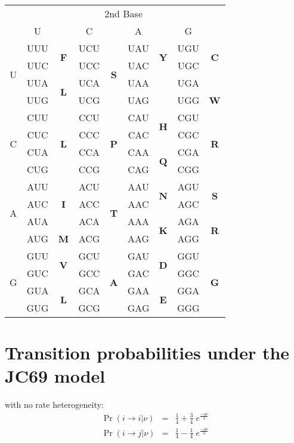 \documentclass[landscape]{foils}
\begin{document}
\begin{table}[htdp]
\begin{center}
\begin{tabular}{|c|cc|cc|cc|cc|}
\hline
 & \multicolumn{8}{c|}{2nd Base}\\
 & U && C && A && G& \\
\hline
 \multirow{4}{*}{U} & UUU & \multirow{2}{*}{\bf F} & UCU & \multirow{4}{*}{\bf S} & UAU & \multirow{2}{*}{\bf Y} & UGU & \multirow{2}{*}{\bf C}\\
	&  UUC & & UCC & & UAC & & UGC & \\
	&  UUA & \multirow{2}{*}{\bf L} & UCA & & UAA & \multirow{2}{*}{\bf *} & UGA & {\bf *} \\
	&  UUG & & UCG &  & UAG & & UGG & {\bf W} \\
 \hline 
 \multirow{4}{*}{C} & CUU & \multirow{4}{*}{\bf L} & CCU & \multirow{4}{*}{\bf P} & CAU & \multirow{2}{*}{\bf H} & CGU & \multirow{4}{*}{\bf R}\\
	 & CUC & & CCC & & CAC & & CGC & \\
	 & CUA & & CCA & & CAA & \multirow{2}{*}{\bf Q} & CGA &  \\
	 & CUG & & CCG &  & CAG & & CGG &  \\
 \hline 
 \multirow{4}{*}{A} & AUU & \multirow{3}{*}{\bf I} & ACU & \multirow{4}{*}{\bf T} & AAU & \multirow{2}{*}{\bf N} & AGU & \multirow{2}{*}{\bf S}\\
 & AUC & & ACC & & AAC & & AGC & \\
 & AUA&  & ACA & & AAA & \multirow{2}{*}{\bf K} & AGA & \multirow{2}{*}{\bf R} \\
 & AUG & {\bf M}& ACG &  & AAG & & AGG & \\
 \hline 
 \multirow{4}{*}{G} & GUU & \multirow{2}{*}{\bf V} & GCU & \multirow{4}{*}{\bf A} & GAU & \multirow{2}{*}{\bf D} & GGU & \multirow{4}{*}{\bf G}\\
 & GUC & & GCC & & GAC & & GGC & \\
 & GUA & \multirow{2}{*}{\bf L} & GCA & & GAA & \multirow{2}{*}{\bf E} & GGA & \\
 & GUG & & GCG &  & GAG & & GGG & \\
 \hline 
\end{tabular}
\end{center}
\label{default}
\end{table}%


\myNewSlide
 

\myNewSlide
\section*{Transition probabilities under the JC69 model}
\Large
with no rate heterogeneity:
\begin{eqnarray*} 
	\Pr(i\rightarrow i | \nu) & = & \frac{1}{4}+\frac{3}{4}\;e^{\frac{-4\nu}{3}} \\
	\Pr(i\rightarrow j |\nu) & = & \frac{1}{4}-\frac{1}{4}\;e^{\frac{-4\nu}{3}} \\
\end{eqnarray*}
\end{document}
